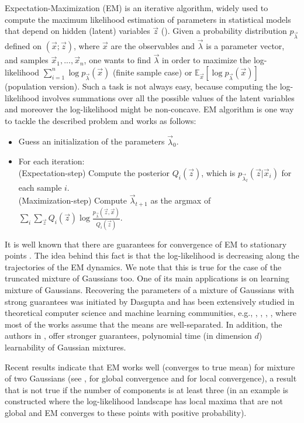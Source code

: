 Expectation-Maximization (EM) is an iterative algorithm, widely used to compute the maximum likelihood estimation of parameters in statistical models that depend on hidden (latent) variables $\vec{z}$ (\cite{DLR77}). Given a
probability distribution $p_{\vec{\lambda}}$ defined on $(\vec{x};\vec{z})$, where $\vec{x}$ are the observables and $\vec{\lambda}$ is a parameter vector, and samples $\vec{x}_1,...,\vec{x}_n$, one wants to find $\vec{\lambda}$ in order to maximize the log-likelihood $\sum_{i=1}^n \log p_{\vec{\lambda}}(\vec{x})$ (finite sample case) or $\mathbb{E}_{\vec{x}}[\log p_{\vec{\lambda}}(\vec{x})]$ (population version). Such a task is not always easy, because computing the log-likelihood involves summations over all the possible values of the latent variables and moreover the log-likelihood might be non-concave. EM algorithm is one way to tackle the described problem and works as follows:
\begin{itemize}
\item Guess an initialization of the parameters $\vec{\lambda}_0$.
\item For each iteration:\\ (Expectation-step) Compute the posterior $Q_i(\vec{z})$, which is $p_{\vec{\lambda}_t}(\vec{z} | \vec{x}_i)$ for each sample $i$.\\ (Maximization-step) Compute $\vec{\lambda}_{t+1}$ as the argmax of $\sum_i \sum_{\vec{z}} Q_i (\vec{z}) \log \frac{p_{\vec{\lambda}}(\vec{z},\vec{x})}{Q_i (\vec{z})}$.
\end{itemize}

It is well known that there are guarantees for convergence of EM to stationary points \cite{W83}. The idea behind this fact is that the log-likelihood is decreasing along the trajectories of the EM dynamics. We note that this is true for the case of the truncated mixture of Gaussians too. One of its main applications is on learning mixture of Gaussians. Recovering the parameters of a mixture of Gaussians with strong guarantees was initiated by Dasgupta \cite{D99} and has been extensively studied in theoretical computer science and machine learning communities, e.g., \cite{AK01}, \cite{KSV05}, \cite{CR08}, \cite{CDV09}, where most of the works assume that the means are well-separated. In addition, the authors in \cite{MV10}, \cite{KMV10} offer stronger guarantees, polynomial time (in dimension $d$) learnability of Gaussian mixtures.

Recent results indicate that EM works well (converges to true mean) for mixture of two Gaussians (see \cite{XHM16}, \cite{DTZ17} for global convergence and \cite{BWY15} for local convergence), a result that is not true if the number of components is at least three (in \cite{JZBWJ16} an example is constructed where the log-likelihood landscape has local maxima that are not global and EM converges to these points with positive probability).

